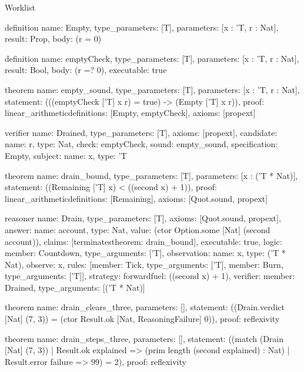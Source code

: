 \begin{lexlean}{Worklist}
\begin{semanticmodule}
definition{
  name: Empty,
  type_parameters: [T],
  parameters: [x : 'T, r : Nat],
  result: Prop,
  body: (r = 0)
}

definition{
  name: emptyCheck,
  type_parameters: [T],
  parameters: [x : 'T, r : Nat],
  result: Bool,
  body: (r =? 0),
  executable: true
}

theorem{
  name: empty_sound,
  type_parameters: [T],
  parameters: [x : 'T, r : Nat],
  statement: (((emptyCheck ['T] x r) = true) -> (Empty ['T] x r)),
  proof: linear_arithmetic{definitions: [Empty, emptyCheck]},
  axioms: [propext]
}

verifier{
  name: Drained,
  type_parameters: [T],
  axioms: [propext],
  candidate: {name: r, type: Nat},
  check: emptyCheck,
  sound: empty_sound,
  specification: Empty,
  subject: {name: x, type: 'T}
}

theorem{
  name: drain_bound,
  type_parameters: [T],
  parameters: [x : ('T * Nat)],
  statement: ((Remaining ['T] x) < ((second x) + 1)),
  proof: linear_arithmetic{definitions: [Remaining]},
  axioms: [Quot.sound, propext]
}

reasoner{
  name: Drain,
  type_parameters: [T],
  axioms: [Quot.sound, propext],
  answer: {name: account, type: Nat, value: (ctor Option.some [Nat] (second account))},
  claims: [terminates{theorem: drain_bound}],
  executable: true,
  logic: {member: Countdown, type_arguments: ['T]},
  observation: {name: x, type: ('T * Nat)},
  observe: x,
  rules: [{member: Tick, type_arguments: ['T]}, {member: Burn, type_arguments: ['T]}],
  strategy: forward{fuel: ((second x) + 1)},
  verifier: {member: Drained, type_arguments: [('T * Nat)]}
}

theorem{
  name: drain_clears_three,
  parameters: [],
  statement: ((Drain.verdict [Nat] (7, 3)) = (ctor Result.ok [Nat, ReasoningFailure] 0)),
  proof: reflexivity{}
}

theorem{
  name: drain_steps_three,
  parameters: [],
  statement: ((match (Drain [Nat] (7, 3))
    | Result.ok explained => (prim length (second explained) : Nat)
    | Result.error failure => 99) = 2),
  proof: reflexivity{}
}
\end{semanticmodule}
\end{lexlean}
